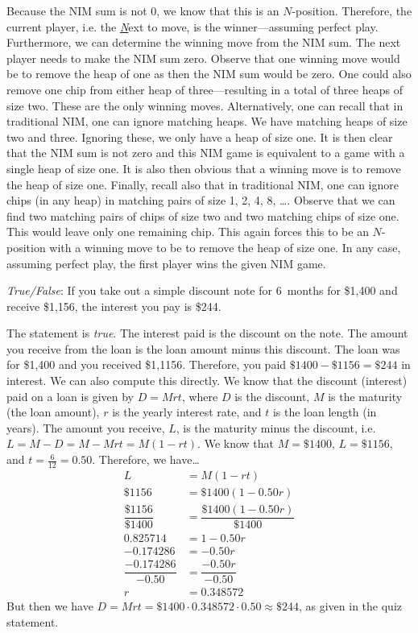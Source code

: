 \documentclass[11pt,letterpaper]{article}
\begin{document}
Because the NIM sum is not 0, we know that this is an $N$-position. Therefore, the current player, i.e. the \textit{\underline{N}}ext to move, is the winner---assuming perfect play. Furthermore, we can determine the winning move from the NIM sum. The next player needs to make the NIM sum zero. Observe that one winning move would be to remove the heap of one as then the NIM sum would be zero. One could also remove one chip from either heap of three---resulting in a total of three heaps of size two. These are the only winning moves. Alternatively, one can recall that in traditional NIM, one can ignore matching heaps. We have matching heaps of size two and three. Ignoring these, we only have a heap of size one. It is then clear that the NIM sum is not zero and this NIM game is equivalent to a game with a single heap of size one. It is also then obvious that a winning move is to remove the heap of size one. Finally, recall also that in traditional NIM, one can ignore chips (in any heap) in matching pairs of size 1, 2, 4, 8, \dots. Observe that we can find two matching pairs of chips of size two and two matching chips of size one. This would leave only one remaining chip. This again forces this to be an $N$-position with a winning move to be to remove the heap of size one. In any case, assuming perfect play, the first player wins the given NIM game. \pvspace{1.3cm}



\quizsol \textit{True/False}: If you take out a simple discount note for 6~months for \$1,400 and receive \$1,156, the interest you pay is \$244. \pspace

\sol The statement is \textit{true}. The interest paid is the discount on the note. The amount you receive from the loan is the loan amount minus this discount. The loan was for \$1,400 and you received \$1,1156. Therefore, you paid $\$1400 - \$1156= \$244$ in interest. We can also compute this directly. We know that the discount (interest) paid on a loan is given by $D= Mrt$, where $D$ is the discount, $M$ is the maturity (the loan amount), $r$ is the yearly interest rate, and $t$ is the loan length (in years). The amount you receive, $L$, is the maturity minus the discount, i.e. $L= M - D= M - Mrt= M( 1 - rt)$. We know that $M= \$1400$, $L= \$1156$, and $t= \frac{6}{12}= 0.50$. Therefore, we have\dots
	\[
	\begin{aligned}
	L&= M(1 - rt) \\
	\$1156&= \$1400 (1 - 0.50r) \\
	\dfrac{\$1156}{\$1400}&= \dfrac{\$1400 (1 - 0.50r)}{\$1400} \\
	0.825714&= 1 - 0.50 r \\
	-0.174286&= -0.50 r \\
	\dfrac{-0.174286}{-0.50}&= \dfrac{-0.50 r}{-0.50} \\
	r&= 0.348572
	\end{aligned}
	\]
But then we have $D= Mrt= \$1400 \cdot 0.348572 \cdot 0.50 \approx \$244$, as given in the quiz statement. \pvspace{1.3cm}
\end{document}
